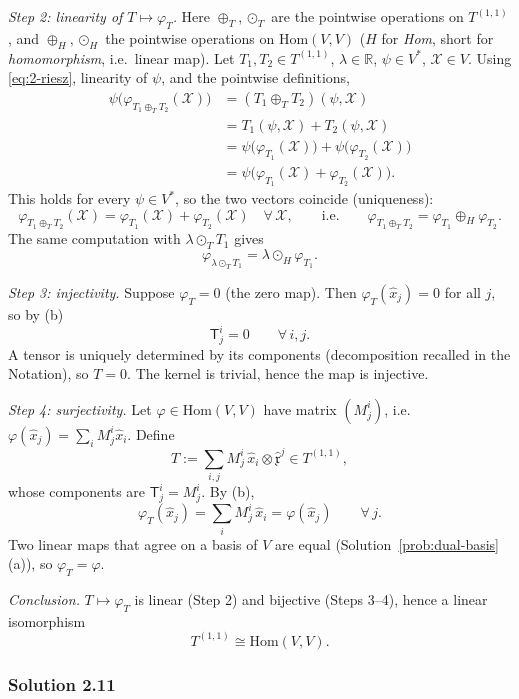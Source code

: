 \documentclass[11pt]{article}
\newcommand{\dual}{V^{*}}
\begin{document}
\smallskip
\noindent\emph{Step 2: linearity of $T\mapsto\varphi_T$.}
Here $\oplus_T,\odot_T$ are the pointwise operations on $T^{(1,1)}$, and $\oplus_H,\odot_H$ the pointwise operations on $\mathrm{Hom}(V,V)$ ($H$ for \emph{Hom}, short for \emph{homomorphism}, i.e.\ linear map). Let $T_1,T_2\in T^{(1,1)}$, $\lambda\in\mathbb R$, $\psi\in\dual$, $\mathcal X\in V$. Using \eqref{eq:2-riesz}, linearity of $\psi$, and the pointwise definitions,
\begin{align*}
\psi\big(\varphi_{T_1\oplus_T T_2}(\mathcal X)\big)
&= (T_1\oplus_T T_2)(\psi,\mathcal X) \\
&= T_1(\psi,\mathcal X)+T_2(\psi,\mathcal X) \\
&= \psi\big(\varphi_{T_1}(\mathcal X)\big)+\psi\big(\varphi_{T_2}(\mathcal X)\big) \\
&= \psi\big(\varphi_{T_1}(\mathcal X)+\varphi_{T_2}(\mathcal X)\big).
\end{align*}
This holds for every $\psi\in\dual$, so the two vectors coincide (uniqueness):
\[
\varphi_{T_1\oplus_T T_2}(\mathcal X)=\varphi_{T_1}(\mathcal X)+\varphi_{T_2}(\mathcal X)\quad\forall\,\mathcal X,
\qquad\text{i.e.}\qquad
\varphi_{T_1\oplus_T T_2}=\varphi_{T_1}\oplus_H\varphi_{T_2}.
\]
The same computation with $\lambda\odot_T T_1$ gives
\[
\varphi_{\lambda\odot_T T_1}=\lambda\odot_H\varphi_{T_1}.
\]

\smallskip
\noindent\emph{Step 3: injectivity.}
Suppose $\varphi_T=0$ (the zero map). Then $\varphi_T(\hat x_j)=0$ for all $j$, so by (b)
\[
\mathsf T^i_j=0\qquad\forall\,i,j.
\]
A tensor is uniquely determined by its components (decomposition recalled in the Notation), so $T=0$. The kernel is trivial, hence the map is injective.

\smallskip
\noindent\emph{Step 4: surjectivity.}
Let $\varphi\in\mathrm{Hom}(V,V)$ have matrix $(M^i_j)$, i.e.\ $\varphi(\hat x_j)=\sum_iM^i_j\hat x_i$. Define
\[
T:=\sum_{i,j}M^i_j\,\hat x_i\otimes\hat{\mathfrak x}^j\in T^{(1,1)},
\]
whose components are $\mathsf T^i_j=M^i_j$. By (b),
\[
\varphi_T(\hat x_j)=\sum_iM^i_j\,\hat x_i=\varphi(\hat x_j)\qquad\forall\,j.
\]
Two linear maps that agree on a basis of $V$ are equal (Solution~\ref{prob:dual-basis}(a)), so $\varphi_T=\varphi$.

\smallskip
\noindent\emph{Conclusion.}
$T\mapsto\varphi_T$ is linear (Step 2) and bijective (Steps 3--4), hence a linear isomorphism
\[
T^{(1,1)}\cong\mathrm{Hom}(V,V).
\]


\subsubsection*{Solution 2.11}
\end{document}

